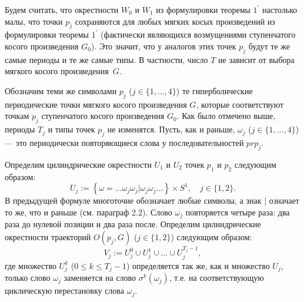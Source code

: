 \documentclass[12pt]{article}
\begin{document}
Будем считать, что окрестности $W_0$ и $W_1$ из формулировки теоремы $\textrm{1}^{\prime}$ настолько малы, что точки $p_j$ сохраняются для любых мягких косых произведений из формулировки теоремы $\textrm{1}^{\prime}$ (фактически являющихся возмущениями ступенчатого косого произведения $G_0$). Это значит, что у аналогов этих точек $p_j$ будут те же самые периоды и те же самые типы. В частности, число $T$ не зависит от выбора мягкого косого произведения~$G$. %

Обозначим теми же символами $p_j$ ($j\in\{1,\ldots,4\}$) те гиперболические периодические точки мягкого косого произведения $G$, которые соответствуют точкам $p_j$ ступенчатого косого произведения $G_0$. Как было отмечено выше, периоды $T_j$ и типы точек $p_j$ не изменятся. Пусть, как и раньше, $\omega_j$ ($j\in\{1,\ldots,4\}$) --- это периодически повторяющиеся слова у последовательностей $pr p_j$. 

Определим цилиндрические окрестности $U_1$ и $U_2$ точек $p_1$ и $p_2$ следующим образом:
$$U_j:=\left\{\omega=\ldots\omega_{j}\omega_{j}|\omega_{j}\omega_{j}\ldots\right\}\times S^1,\quad j\in\{1,2\}.$$
В предыдущей формуле многоточие обозначает любые символы, а знак $|$ означает то же, что и раньше (см. параграф 2.2). Слово $\omega_j$ повторяется четыре раза: два раза до нулевой позиции и два раза после. Определим цилиндрические окрестности траекторий $O(p_j,G)$ ($j\in\{1,2\}$) следующим образом:
$$V_j:=U^0_j\cup U^1_j\cup\ldots\cup U^{T_j-1}_j,$$
где множество $U_j^k$ ($0\leq k\leq T_j-1$) определяется так же, как и множество $U_j$, только слово $\omega_j$ заменяется на слово $\sigma^{k}(\omega_j)$, т.е. на соответствующую циклическую перестановку слова $\omega_j$. 
\end{document}
